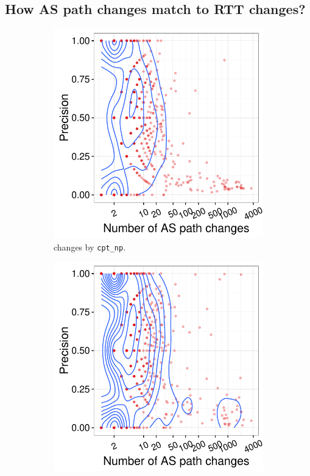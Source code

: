 \subsection{How AS path changes match to RTT changes?}
\begin{figure}[!htb]
    \centering
    \begin{subfigure}[b]{.48\textwidth}
	\centering
	\includegraphics[width=\textwidth]{gfx/chap4/as_path_ch_precision_np.pdf}
	\caption{\footnotesize changes by \texttt{cpt\_np}.}
	\label{fig:as_path_ch_precision_np}
	\end{subfigure}
	\begin{subfigure}[b]{.48\textwidth}
	\centering
    \includegraphics[width=\textwidth]{gfx/chap4/as_path_ch_precision_poisson.pdf}

\end{subfigure}
\end{figure}
